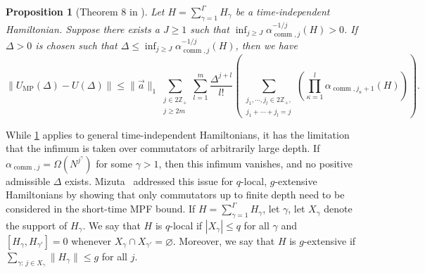 \documentclass[10pt,reqno]{article}
\numberwithin{equation}{section}
\theoremstyle{plain}
\newtheorem{prop}[thm]{Proposition}
\theoremstyle{definition}
\begin{document}
\begin{prop}[Theorem 8 in \cite{aftab2024mpf}]
\label{aftab-time-indep-short}
Let $H=\sum_{\gamma=1}^{\Gamma} H_\gamma$ be a time-independent Hamiltonian. Suppose there exists a  $J \geq 1$ such that $\inf_{j \geq J} \alpha_{\operatorname{comm},j}^{-1/j}(H) > 0$. If $\Delta > 0$ is chosen such that $\Delta \leq  \inf_{j \geq J} \alpha_{\operatorname{comm},j}^{-1/j}(H)$, then we have
        \begin{equation}
            \|U_{\operatorname{MP}} (\Delta) - U(\Delta)\| \leq \|\vec{a}\|_1 \sum_{\substack{j \in 2\mathbb{Z}_+ \\ j \geq 2m}} \sum_{l=1}^{m}  \frac{\Delta^{j+l}}{l!} \left(\sum_{\substack{j_1,\cdots,j_l \in 2\mathbb{Z}_+, \\ j_1+\cdots+j_l=j}} \left(\prod_{\kappa=1}^{l}  \alpha_{\operatorname{comm},j_{\kappa}+1}(H)\right) \right). 
        \end{equation}
\end{prop}

While \cref{aftab-time-indep-short} applies to general time-independent Hamiltonians, it has the limitation that the infimum is taken over commutators of arbitrarily large depth. If \(\alpha_{\operatorname{comm},j}=\Omega(N^{j^\gamma})\) for some \(\gamma>1\), then this infimum vanishes, and no positive admissible \(\Delta\) exists. Mizuta~\cite{mizuta2025commutatorscalinghamiltoniansimulation} addressed this issue for \(q\)-local, \(g\)-extensive Hamiltonians by showing that only commutators up to finite depth need to be considered in the short-time MPF bound. If $H=\sum_{\gamma=1}^{\Gamma} H_\gamma$, let $\gamma$, let $X_\gamma$ denote the support of $H_\gamma$. We say that $H$ is $q$-local if $|X_\gamma|\le q$ for all $\gamma$ and $[H_\gamma,H_{\gamma'}]=0$ whenever $X_\gamma\cap X_{\gamma'}=\varnothing$. Moreover, we say that $H$ is $g$-extensive if $ \sum_{\gamma:\, j\in X_\gamma}\|H_\gamma\| \le g$ for all $j$. 
\end{document}
